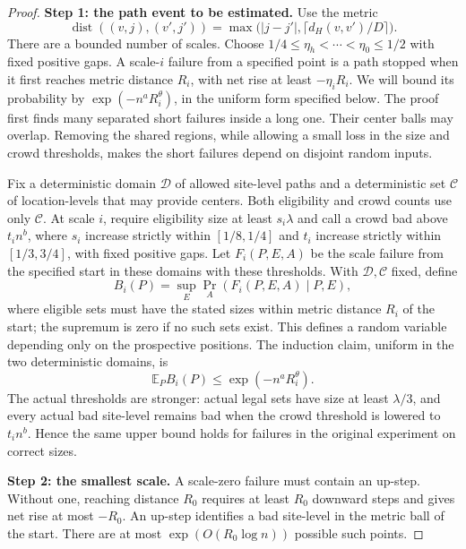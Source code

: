 \begin{proof}
\noindent\textbf{Step 1: the path event to be estimated.}\quad
Use the metric
\[
 \operatorname{dist}((v,j),(v',j'))
   =\max\bigl(|j-j'|,\lceil d_H(v,v')/D\rceil\bigr).
\]
There are a bounded number of scales. Choose
\(1/4\le\eta_h<\cdots<\eta_0\le1/2\) with fixed positive gaps. A
scale-\(i\) failure from a specified point is a path stopped when it first
reaches metric distance \(R_i\), with net rise at least \(-\eta_iR_i\).
We will bound its probability by \(\exp(-n^aR_i^\theta)\), in the uniform
form specified below. The proof first finds many separated short failures inside a long one.
Their center balls may overlap. Removing the shared regions, while
allowing a small loss in the size and crowd thresholds, makes the short
failures depend on disjoint random inputs.

Fix a deterministic domain \(\mathcal D\) of allowed site-level paths and
a deterministic set \(\mathcal C\) of location-levels that may provide
centers. Both eligibility and crowd counts use only \(\mathcal C\).
At scale \(i\), require eligibility
size at least \(s_i\lambda\) and call a crowd bad above \(t_i n^b\), where
\(s_i\) increase strictly within \([1/8,1/4]\) and \(t_i\) increase
strictly within \([1/3,3/4]\), with fixed positive gaps. Let
\(F_i(P,E,A)\) be the scale failure from the specified start in these
domains with these thresholds. With \(\mathcal D,\mathcal C\) fixed, define
\[
 B_i(P)=\sup_E\Pr_A(F_i(P,E,A)\mid P,E),
\]
where eligible sets must have the stated sizes within metric distance
\(R_i\) of the start; the supremum is zero if no such sets exist. This
defines a random variable depending only on the prospective positions.
The induction claim, uniform in the two deterministic domains, is
\begin{equation}
 \mathbb E_P B_i(P)\le\exp(-n^aR_i^\theta).
 \label{eq:source-H}
\end{equation}
The actual thresholds are stronger:
actual legal sets have size at least \(\lambda/3\), and every actual bad
site-level remains bad when the crowd threshold is lowered to
\(t_i n^b\). Hence the same upper bound holds for failures in the original
experiment on correct sizes.

\noindent\textbf{Step 2: the smallest scale.}\quad
A scale-zero failure must contain an up-step. Without one, reaching
distance \(R_0\) requires at least \(R_0\) downward steps and gives net
rise at most \(-R_0\). An up-step identifies a bad site-level in the
metric ball of the start. There are at most
\(\exp(O(R_0\log n))\) possible such points.


\end{proof}
